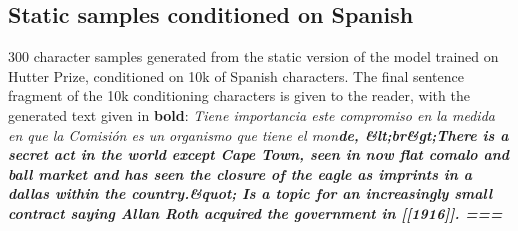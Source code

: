 \documentclass{article} \usepackage{iclr2018_conference,times}
\begin{document}
\subsection{Static samples conditioned on Spanish}
300 character samples generated from the static version of the model trained on Hutter Prize, conditioned on 10k of Spanish characters. The final sentence fragment of the 10k conditioning characters is given to the reader, with the generated text given in \textbf{bold}:
\newline
\newline
\newline
\textsl{
Tiene importancia este compromiso en la medida en que la Comisión es un organismo que tiene el mon\textbf{de,
\newline
\&lt;br\&gt;There is a secret act in the world except Cape Town, seen in now flat comalo and ball market and has seen the closure of the eagle as imprints in a dallas within the country.\&quot; Is a topic for an increasingly small contract saying Allan Roth acquired the government in {[}{[}1916{]}{]}.
\newline
\newline
===
}
}
\end{document}
